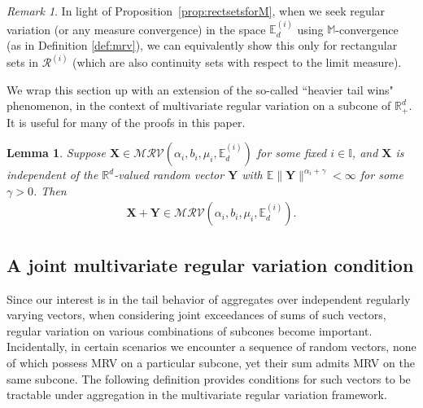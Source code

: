 \documentclass[aos]{imsart}
\numberwithin{equation}{section}
\theoremstyle{plain} %
\newtheorem{lemma}[theorem]{Lemma}
\theoremstyle{remark}
\newtheorem{remark}[theorem]{Remark}
\newcommand{\E}{\mathbb{E}}
\newcommand{\M}{\mathbb{M}}
\newcommand{\R}{\mathbb{R}}
\newcommand{\VF}[1]{{\color{blue} #1}}
\def\MRV{\mathcal{MRV}}
\def\RV{\mathcal{RV}}
\def\cR{\mathcal{R}}
\def\bX{\boldsymbol X}
\def\bY{\boldsymbol Y}
\newcommand{\DAS}[1]{{\color{red} #1}}
\begin{document}
\begin{remark}
In light of Proposition~\ref{prop:rectsetsforM}, when we seek regular variation (or any measure convergence) in the space $\E_d^{(i)}$ using $\M$-convergence (as in Definition \ref{def:mrv}), we can equivalently show this only for rectangular sets in $\cR^{(i)}$ (which are also continuity sets with respect to the limit measure).
\end{remark}
We wrap this section up with  an extension of the so-called ``heavier tail wins" phenomenon, in the context of multivariate regular variation on a subcone of $\R_+^d$. It is useful for many of the proofs in this paper.


\begin{lemma} \label{Lemma_aux}
Suppose $\bX\in \MRV(\alpha_i,b_i,\mu_i,\E_d^{(i)})$
for some fixed $i\in\mathbb{I}$, and $\bX$ is independent of the $\R^d$-valued
random vector $\bY$ with $\E\|\bY\|^{\alpha_i+\gamma}<\infty$
for some $\gamma>0$. Then
\begin{eqnarray*}
    \bX+\bY\in\MRV(\alpha_i,b_i,\mu_i,\E_d^{(i)}).
\end{eqnarray*}
\end{lemma}

\subsection{A joint multivariate regular variation condition}\label{subsec:jointmrv}
Since our interest is in the tail behavior of aggregates over independent regularly varying vectors, when considering joint exceedances of sums of such vectors, regular variation on various combinations of subcones become important. Incidentally, in certain scenarios we encounter a sequence of random vectors, none of which possess MRV on a particular subcone, yet their sum admits MRV on the same subcone. The following definition provides conditions for such  vectors to be tractable under aggregation in the multivariate regular variation framework.
\end{document}
